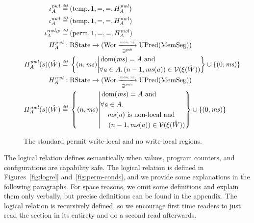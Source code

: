 \documentclass[format=acmsmall, review=true, screen=true]{acmart}
\renewcommand{\figurename}{Figure}
\newcommand{\fun}{\rightarrow}
\newcommand{\defeq}{\stackrel{\textit{\tiny{def}}}{=}}
\newcommand{\union}{\mathbin{\cup}}
\DeclareMathOperator{\dom}{dom}
\newcommand\dominique[1]{{\color{purple} \sf \footnotesize {DD: #1}}\\}
\renewcommand\dominique[1]{}
\newcommand{\var}[1]{\mathit{#1}}
\newcommand{\hs}{\var{ms}}
\newcommand{\ms}{\hs}
\newcommand{\addr}{\var{a}}
\newcommand{\nwl}{\var{nwl}}
\newcommand{\pwl}{\var{pwl}}
\newcommand{\futurewk}{\mathbin{\sqsupseteq}^{\var{pub}}}
\newcommand{\futurestr}{\mathbin{\sqsupseteq}^{\var{priv}}}
\newcommand{\monwknefun}{\xrightarrow[\text{\tiny{$\futurewk$}}]{\textit{\tiny{mon, ne}}}}
\newcommand{\monstrnefun}{\xrightarrow[\text{\tiny{$\futurestr$}}]{\textit{\tiny{mon, ne}}}}
\newcommand{\asmType}{\plaindom{AsmType}}
\newcommand{\plaindom}[1]{\mathrm{#1}}
\newcommand{\HeapSegments}{\plaindom{MemSeg}}
\newcommand{\States}{\plaindom{RState}}
\newcommand{\Wor}{\plaindom{Wor}}
\newcommand{\UPred}[1]{\plaindom{UPred}(#1)}
\newcommand{\intr}[2]{\mathcal{#1}}
\newcommand{\valueintr}[1]{\intr{V}{#1}}
\newcommand{\stdvr}{\valueintr{\asmType}}
\newcommand{\npair}[2][n]{\left(#1,#2 \right)}
\newcommand{\plainview}[1]{\mathrm{#1}}
\newcommand{\perma}{\plainview{perm}}
\newcommand{\temp}{\plainview{temp}}
\newcommand{\nonlocal}[1]{\ensuremath{#1} \text{ is non-local}}
\begin{document}
{\begin{figure}[htb]
\begin{align*}
  \iota^\pwl_A \defeq{} & (\temp,1,=,=,H^\pwl_A) \\
  \iota^\nwl_A \defeq{} & (\temp,1,=,=,H^\nwl_A) \\
  \iota^{\nwl,p}_A \defeq{} & (\perma,1,=,=,H^\nwl_A)\\
    H^\pwl_A :{} & \States \fun (\Wor \monwknefun \UPred{\HeapSegments})\\
  H^\pwl_A (s)(\hat{W}) \defeq{} & \left\{\npair{\hs} \middle|
    \begin{aligned}
      &\dom(\hs) = A \text{ and } \\
      &\forall \addr \in A \ldotp \npair[n-1]{\hs(\addr)} \in \stdvr(\xi(\hat{W}))
    \end{aligned}
        \right\} \union \{\npair[0]{\ms} \} \\
    H^\nwl_A :{} & \States \fun (\Wor \monstrnefun \UPred{\HeapSegments})\\
  H^\nwl_A (s)(\hat{W}) \defeq{} & \left\{\npair{\hs} \middle|
    \begin{aligned}
      &\dom(\hs) = A \text{ and } \\
      &\forall \addr \in A \ldotp \\
      &\quad \nonlocal{\ms(\addr)} \text{ and }\\ 
      &\quad \npair[n-1]{\hs(\addr)} \in \stdvr(\xi(\hat{W}))
    \end{aligned}
        \right\} \union \{\npair[0]{\ms} \}
\end{align*}

  \caption{The standard permit write-local and no write-local regions.}
  \label{fig:std-reg}
\end{figure}
}


The logical relation defines semantically when values, program counters, and configurations are capability safe.
The logical relation is defined in \figurename{}s~\ref{fig:logrel} and~\ref{fig:perm-conds}, and we provide some explanations in the following paragraphs.
For space reasons, we omit some definitions and explain them only verbally, but precise definitions can be found in the appendix.
The logical relation is recursively defined, so we encourage first time readers to just read the section in its entirety and do a second read afterwards.
\end{document}
